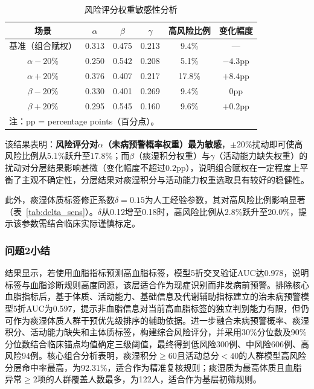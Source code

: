 \documentclass[a4paper,12pt]{ctexart}
\begin{document}
\begin{table}[H]
\centering
\caption{风险评分权重敏感性分析}
\label{tab:sens}
\begin{tabular}{cccccc}
\toprule
\textbf{场景} & $\alpha$ & $\beta$ & $\gamma$ & \textbf{高风险比例} & \textbf{变化幅度} \\
\midrule
基准（组合赋权） & 0.313 & 0.475 & 0.213 & 9.4\% & --- \\
$\alpha-20\%$ & 0.250 & 0.542 & 0.208 & 5.1\% & $-4.3$pp \\
$\alpha+20\%$ & 0.376 & 0.407 & 0.217 & 17.8\% & $+8.4$pp \\
$\beta-20\%$ & 0.330 & 0.401 & 0.269 & 9.4\% & $0$pp \\
$\beta+20\%$ & 0.295 & 0.545 & 0.160 & 9.6\% & $+0.2$pp \\
\bottomrule
\multicolumn{6}{l}{\small 注：pp = percentage points（百分点）。}
\end{tabular}
\end{table}

该结果表明：\textbf{风险评分对$\alpha$（未病预警概率权重）最为敏感}，$\pm20\%$扰动即可使高风险比例从$5.1\%$跃升至$17.8\%$；而$\beta$（痰湿积分权重）与$\gamma$（活动能力缺失权重）的扰动对分层结果影响甚微（变化幅度不超过$0.2$pp），说明组合赋权在一定程度上平衡了主观不确定性，分层结果对痰湿积分与活动能力权重选取具有较好的稳健性。

此外，痰湿体质标签修正系数$\delta=0.15$为人工经验参数，其对高风险比例影响显著（表~\ref{tab:delta_sens}）。$\delta$从0.12增至0.18时，高风险比例从2.8\%跃升至20.0\%，提示该参数需结合临床实际谨慎标定。

\subsubsection{问题2小结}

结果显示，若使用血脂指标预测高血脂标签，模型5折交叉验证AUC达0.978，说明标签与血脂诊断规则高度同源，该层适合作为现症识别而非发病前预警。排除核心血脂指标后，基于体质、活动能力、基础信息及代谢辅助指标建立的治未病预警模型5折AUC为0.597，提示非血脂信息对当前高血脂标签的独立判别能力有限，但仍可作为痰湿体质人群干预优先级排序的辅助依据。进一步融合未病预警概率、痰湿积分、活动能力缺失和主体质标签，构建综合风险评分，并采用30\%分位数及90\%分位数结合临床锚点均值确定三级阈值，最终得到低风险300例、中风险606例、高风险94例。核心组合分析表明，痰湿积分$\geq60$且活动总分$<40$的人群模型高风险分层命中率最高，为92.31\%，适合作为精准复核规则；痰湿质为最高体质且血脂异常$\geq2$项的人群覆盖人数最多，为122人，适合作为基层初筛规则。
\end{document}
